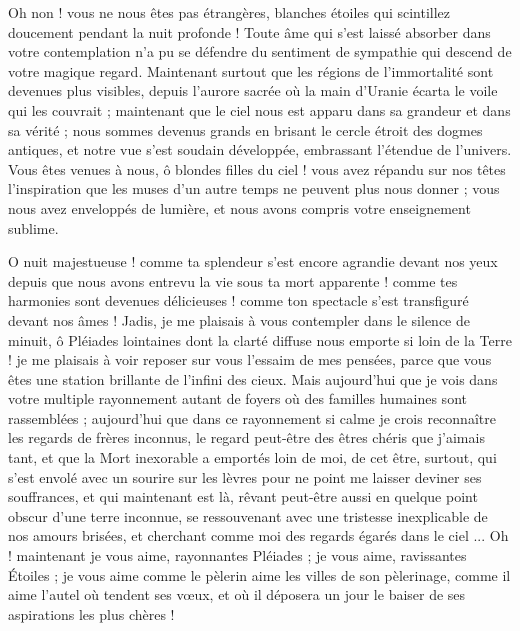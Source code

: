 \documentclass[a4paper, 11pt, oneside]{article}
\begin{document}
Oh non ! vous ne nous êtes pas étrangères, blanches étoiles qui scintillez doucement pendant la nuit profonde ! Toute âme qui s'est laissé absorber dans votre contemplation n'a pu se défendre du sentiment de sympathie qui descend de votre magique regard. Maintenant surtout que les régions de l'immortalité sont devenues plus visibles, depuis l'aurore sacrée où la main d'Uranie écarta le voile qui les couvrait ; maintenant que le ciel nous est apparu dans sa grandeur et dans sa vérité ; nous sommes devenus grands en brisant le cercle étroit des dogmes antiques, et notre vue s'est soudain développée, embrassant l'étendue de l'univers. Vous êtes venues à nous, ô blondes filles du ciel ! vous avez répandu sur nos têtes l'inspiration que les muses d'un autre temps ne peuvent plus nous donner ; vous nous avez enveloppés de lumière, et nous avons compris votre enseignement sublime.

O nuit majestueuse ! comme ta splendeur s'est encore agrandie devant nos yeux depuis que nous avons entrevu la vie sous ta mort apparente ! comme tes harmonies sont devenues délicieuses ! comme ton spectacle s'est transfiguré devant nos âmes ! Jadis, je me plaisais à vous contempler dans le silence de minuit, ô Pléiades lointaines dont la clarté diffuse nous emporte si loin de la Terre ! je me plaisais à voir reposer sur vous l'essaim de mes pensées, parce que vous êtes une station brillante de l'infini des cieux. Mais aujourd'hui que je vois dans votre multiple rayonnement autant de foyers où des familles humaines sont rassemblées ; aujourd'hui que dans ce rayonnement si calme je crois reconnaître les regards de frères inconnus, le regard peut-être des êtres chéris que j'aimais tant, et que la Mort inexorable a emportés loin de moi, de cet être, surtout, qui s'est envolé avec un sourire sur les lèvres pour ne point me laisser deviner ses souffrances, et qui maintenant est là, rêvant peut-être aussi en quelque point obscur d'une terre inconnue, se ressouvenant avec une tristesse inexplicable de nos amours brisées, et cherchant comme moi des regards égarés dans le ciel ... Oh ! maintenant je vous aime, rayonnantes Pléiades ; je vous aime, ravissantes Étoiles ; je vous aime comme le pèlerin aime les villes de son pèlerinage, comme il aime l'autel où tendent ses vœux, et où il déposera un jour le baiser de ses aspirations les plus chères !
\end{document}
